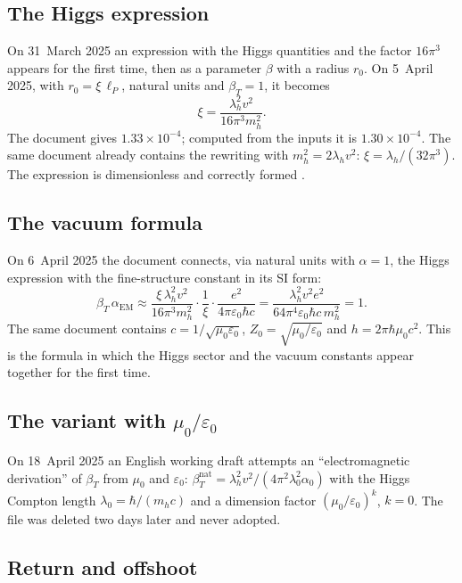 \subsection{The Higgs expression}

On 31~March 2025 an expression with the Higgs quantities and the factor $16\pi^3$ appears for the
first time, then as a parameter $\beta$ with a radius $r_0$. On 5~April 2025, with
$r_0=\xi\,\ell_P$, natural units and $\beta_T=1$, it becomes
\begin{equation}
  \xi=\frac{\lambda_h^2v^2}{16\pi^3m_h^2}.
\end{equation}
The document gives $1.33\times10^{-4}$; computed from the inputs it is $1.30\times10^{-4}$. The same
document already contains the rewriting with $m_h^2=2\lambda_hv^2$: $\xi=\lambda_h/(32\pi^3)$. The
expression is dimensionless and correctly formed \BM.

\subsection{The vacuum formula}

On 6~April 2025 the document connects, via natural units with $\alpha=1$, the Higgs expression
with the fine-structure constant in its SI form:
\begin{equation}
  \beta_T\,\alpha_{\text{EM}}\approx\frac{\xi\,\lambda_h^2v^2}{16\pi^3m_h^2}\cdot\frac1\xi\cdot
  \frac{e^2}{4\pi\varepsilon_0\hbar c}
  =\frac{\lambda_h^2v^2e^2}{64\pi^4\varepsilon_0\hbar c\,m_h^2}=1 .
  \label{eq:vakuum}
\end{equation}
The same document contains $c=1/\sqrt{\mu_0\varepsilon_0}$, $Z_0=\sqrt{\mu_0/\varepsilon_0}$ and
$h=2\pi\hbar\mu_0c^2$. This is the formula in which the Higgs sector and the vacuum constants
appear together for the first time.

\subsection{The variant with \texorpdfstring{$\mu_0/\varepsilon_0$}{mu0/eps0}}

On 18~April 2025 an English working draft attempts an ``electromagnetic derivation'' of
$\beta_T$ from $\mu_0$ and $\varepsilon_0$:
$\beta_T^{\text{nat}}=\lambda_h^2v^2/(4\pi^2\lambda_0^2\alpha_0)$ with the Higgs Compton length
$\lambda_0=\hbar/(m_hc)$ and a dimension factor $(\mu_0/\varepsilon_0)^k$, $k=0$. The file was
deleted two days later and never adopted.

\subsection{Return and offshoot}

